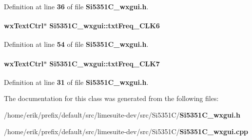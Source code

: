 Definition at line {\bf 36} of file {\bf Si5351\+C\+\_\+wxgui.\+h}.

\paragraph[{txt\+Freq\+\_\+\+C\+L\+K6}]{\setlength{\rightskip}{0pt plus 5cm}wx\+Text\+Ctrl$\ast$ Si5351\+C\+\_\+wxgui\+::txt\+Freq\+\_\+\+C\+L\+K6}\label{classSi5351C__wxgui_abe70745fa8089bbb0f4cb7385217a95d}


Definition at line {\bf 54} of file {\bf Si5351\+C\+\_\+wxgui.\+h}.

\paragraph[{txt\+Freq\+\_\+\+C\+L\+K7}]{\setlength{\rightskip}{0pt plus 5cm}wx\+Text\+Ctrl$\ast$ Si5351\+C\+\_\+wxgui\+::txt\+Freq\+\_\+\+C\+L\+K7}\label{classSi5351C__wxgui_ab9f8f5f6f4518640c6a4c26c4971ef2e}


Definition at line {\bf 31} of file {\bf Si5351\+C\+\_\+wxgui.\+h}.



The documentation for this class was generated from the following files\+:\begin{DoxyCompactItemize}
\item 
/home/erik/prefix/default/src/limesuite-\/dev/src/\+Si5351\+C/{\bf Si5351\+C\+\_\+wxgui.\+h}\item 
/home/erik/prefix/default/src/limesuite-\/dev/src/\+Si5351\+C/{\bf Si5351\+C\+\_\+wxgui.\+cpp}\end{DoxyCompactItemize}

